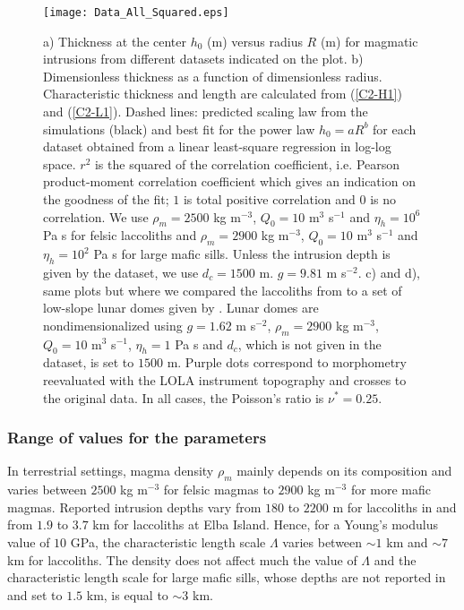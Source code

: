 \begin{figure}[htpb]
  \begin{center}
    \graphicspath{ {/Users/thorey/Documents/These/Projet/Refroidissement/Skin_Model/Figure/Figure_Data/} }
    \texttt{[image: Data\_All\_Squared.eps]}
    \caption{a) Thickness  at the center  $h_0$ (m) versus  radius $R$
      (m) for magmatic intrusions from different datasets indicated on
      the  plot.    b)  Dimensionless  thickness  as   a  function  of
      dimensionless  radius. Characteristic  thickness and  length are
      calculated from (\ref{C2-H1})  and (\ref{C2-L1}).  Dashed lines:
      predicted scaling law from the  simulations (black) and best fit
      for the  power law $h_0=aR^b$  for each dataset obtained  from a
      linear least-square  regression in log-log space.   $r^2$ is the
      squared   of   the   correlation  coefficient,   i.e.    Pearson
      product-moment correlation coefficient which gives an indication
      on the  goodness of the  fit; $1$ is total  positive correlation
      and $0$  is no correlation.   We use $\rho_m=2500$  kg m$^{-3}$,
      $Q_0  =10$ m$^3$  s$^{-1}$  and $\eta_h=10^6$  Pa  s for  felsic
      laccoliths  and  $\rho_m=2900$  kg  m$^{-3}$,  $Q_0  =10$  m$^3$
      s$^{-1}$ and $\eta_h=10^2$  Pa s for large  mafic sills.  Unless
      the intrusion depth  is given by the dataset,  we use $d_c=1500$
      m.  $g=9.81$  m s$^{-2}$.  c)  and d),  same plots but  where we
      compared the  laccoliths from \citet{Rocchi:2002jy} to  a set of
      low-slope  lunar domes  given  by \citet{Wohler:2009jj}.   Lunar
      domes   are  nondimensionalized   using  $g=1.62$   m  s$^{-2}$,
      $\rho_m=2900$ kg m$^{-3}$, $Q_0  =10$ m$^3$ s$^{-1}$, $\eta_h=1$
      Pa s  and $d_c$, which  is not given in  the dataset, is  set to
      $1500$ m. Purple dots correspond to morphometry reevaluated with
      the  LOLA  instrument topography  and  crosses  to the  original
      data. In all cases, the Poisson's ratio is $\nu^*=0.25$.}
    \label{C2-Corry_Rocchie}
  \end{center}
\end{figure}

\subsubsection*{Range of values for the parameters}
\label{sec:range-valu-param}

In terrestrial settings, magma density  $\rho_m$ mainly depends on its
composition and varies  between $ 2500$ kg m$^{-3}$  for felsic magmas
to  $2900$ kg  m$^{-3}$  for more  mafic  magmas.  Reported  intrusion
depths vary from $180$ to  $2200$ m for laccoliths in \citet{E:2015tl}
and from $1.9$ to $3.7$ km  for laccoliths at Elba Island.  Hence, for
a Young's modulus  value of $10$ GPa, the  characteristic length scale
$\Lambda$ varies between  $\sim 1$ km and $\sim 7$  km for laccoliths.
The  density does  not  affect much  the value  of  $\Lambda$ and  the
characteristic length  scale for large  mafic sills, whose  depths are
not reported  in \citet{Cruden:tg} and  set to  $1.5$ km, is  equal to
$\sim 3$ km.

